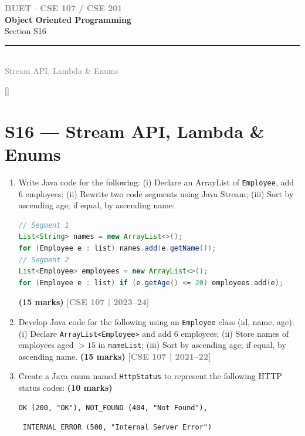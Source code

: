 \documentclass[12pt,a3paper]{article}
\newcommand{\yr}[1]{\hfill\textcolor{gray}{\small\textbf{[#1]}}}
\newcommand{\mk}[1]{\textcolor{orange!70!black}{\small\textbf{(#1 marks)}}}
\newcommand{\secdivider}[4]{%
  \newpage\thispagestyle{empty}%
  \vspace*{\fill}%
  \begin{tcolorbox}[enhanced,colback=#4!7,colframe=#3,boxrule=1.5pt,arc=8pt,
    left=20pt,right=20pt,top=22pt,bottom=22pt,
    shadow={3pt}{-3pt}{0pt}{black!15}]
    \centering
    {\large\textcolor{gray}{\textbf{BUET $\cdot$ CSE 107 / CSE 201}}}\\[8pt]
    {\fontsize{26}{32}\selectfont\bfseries\textcolor{#3}{Object Oriented Programming}}\\[6pt]
    {\fontsize{15}{19}\selectfont\textcolor{dgray}{#1}}\\[12pt]
    \textcolor{#3!60}{\rule{0.5\textwidth}{0.5pt}}\\[6pt]
    {\small\textcolor{gray}{#2}}
  \end{tcolorbox}%
  \vspace*{\fill}\newpage%
}
\begin{document}
\secdivider{Section S16}{Stream API, Lambda \& Enums}{cH}{cH}
\label{sec:S16}
\titleformat{\section}{\large\bfseries\color{cH}}{}{0em}{}[\titlerule]
\section{S16 --- Stream API, Lambda \& Enums}

\begin{enumerate}
\item Write Java code for the following: (i) Declare an ArrayList of \texttt{Employee}, add 6 employees; (ii) Rewrite two code segments using Java Stream; (iii) Sort by ascending age; if equal, by ascending name:
\begin{lstlisting}[language=Java]
// Segment 1
List<String> names = new ArrayList<>();
for (Employee e : list) names.add(e.getName());
// Segment 2
List<Employee> employees = new ArrayList<>();
for (Employee e : list) if (e.getAge() <= 20) employees.add(e);
\end{lstlisting}
\mk{15}
\yr{CSE 107 | 2023--24}





\item Develop Java code for the following using an \texttt{Employee} class (id, name, age): (i) Declare \texttt{ArrayList<Employee>} and add 6 employees; (ii) Store names of employees aged $> 15$ in \texttt{nameList}; (iii) Sort by ascending age; if equal, by ascending name. \mk{15}
\yr{CSE 107 | 2021--22}





\item Create a Java enum named \texttt{HttpStatus} to represent the following HTTP status codes: \mk{10}

\begin{verbatim}
OK (200, "OK"), NOT_FOUND (404, "Not Found"),
\end{verbatim}
\begin{verbatim}
 INTERNAL_ERROR (500, "Internal Server Error")
\end{verbatim}


\end{enumerate}
\end{document}

